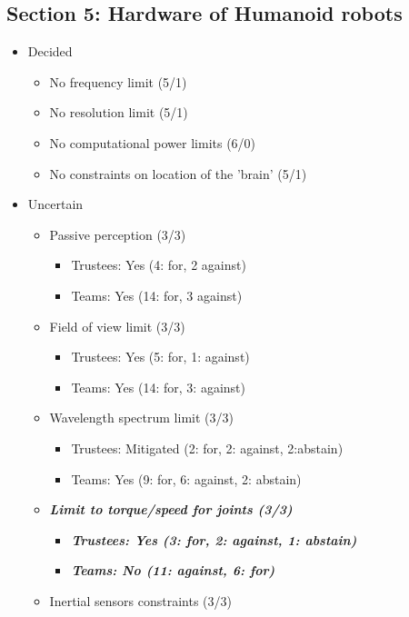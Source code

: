 \documentclass{article}
\begin{document}
\subsection{Section 5: Hardware of Humanoid robots}

\begin{itemize} 
   \item Decided
   \begin{itemize} 
       \item No frequency limit (5/1)
       \item No resolution limit (5/1)
       \item No computational power limits (6/0)
       \item No constraints on location of the 'brain' (5/1)
\end{itemize}
   \item Uncertain
   \begin{itemize} 
       \item Passive perception (3/3)
       \begin{itemize} 
           \item Trustees: Yes (4: for, 2 against)
           \item Teams: Yes (14: for, 3 against)
   \end{itemize}
       \item Field of view limit (3/3)
       \begin{itemize} 
           \item Trustees: Yes (5: for, 1: against)
           \item Teams: Yes (14: for, 3: against)
   \end{itemize}
       \item Wavelength spectrum limit (3/3)
       \begin{itemize} 
           \item Trustees: Mitigated (2: for, 2: against, 2:abstain)
           \item Teams: Yes (9: for, 6: against, 2: abstain)
   \end{itemize}
       \item \textbf{\textit{Limit to torque/speed for joints (3/3)}}
       \begin{itemize} 
           \item \textbf{\textit{Trustees: Yes (3: for, 2: against, 1: abstain)}}
           \item \textbf{\textit{Teams: No (11: against, 6: for)}}
   \end{itemize}
       \item Inertial sensors constraints (3/3)

\end{itemize}
\end{itemize}
\end{document}
